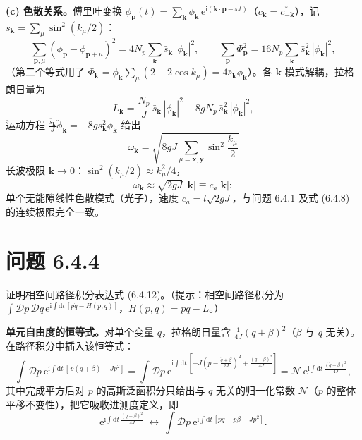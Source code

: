 \textbf{(c) 色散关系。}傅里叶变换 $\phi_{\pmb p}(t)=\sum_{\pmb k}\phi_{\pmb k}\,\mathrm{e}^{\mathrm{i}(\pmb k\cdot\pmb p-\omega t)}$（$c_{\pmb k}=c^*_{-\pmb k}$），记 $\bar s_{\pmb k}=\sum_{\mu}\sin^{2}(k_\mu/2)$：
\begin{equation*}
\sum_{\pmb p,\mu}(\phi_{\pmb p}-\phi_{\pmb p+\mu})^{2}
=4N_p\sum_{\pmb k}\bar s_{\pmb k}\,|\phi_{\pmb k}|^{2},
\qquad
\sum_{\pmb p}\Phi_{\pmb p}^{2}
=16N_p\sum_{\pmb k}\bar s_{\pmb k}^{2}\,|\phi_{\pmb k}|^{2},
\end{equation*}
（第二个等式用了 $\Phi_{\pmb k}=\phi_{\pmb k}\sum_\mu(2-2\cos k_\mu)=4\bar s_{\pmb k}\phi_{\pmb k}$）。各 $\pmb k$ 模式解耦，拉格朗日量为
\begin{equation*}
L_{\pmb k}=\frac{N_p}{J}\,\bar s_{\pmb k}\,|\dot\phi_{\pmb k}|^{2}-8gN_p\,\bar s_{\pmb k}^{2}\,|\phi_{\pmb k}|^{2},
\end{equation*}
运动方程 $\frac{\bar s_{\pmb k}}{J}\ddot\phi_{\pmb k}=-8g\bar s_{\pmb k}^{2}\phi_{\pmb k}$ 给出
\begin{equation*}
\boxed{\ \omega_{\pmb k}=\sqrt{8gJ\sum_{\mu=\pmb x,\pmb y}\sin^{2}\frac{k_\mu}{2}}\ }
\end{equation*}
长波极限 $\pmb k\to0$：$\sin^{2}(k_\mu/2)\approx k_\mu^{2}/4$，
\begin{equation*}
\omega_{\pmb k}\approx\sqrt{2gJ}\,|\pmb k|\equiv c_a|\pmb k| :
\end{equation*}
单个无能隙线性色散模式（光子），速度 $c_a=l\sqrt{2gJ}$，与问题 6.4.1 及式 (6.4.8) 的连续极限完全一致。

\section*{问题 6.4.4}
\begin{problem}
证明相空间路径积分表达式 (6.4.12)。（提示：相空间路径积分为 $\int\mathcal{D}p\,\mathcal{D}q\,\mathrm{e}^{\mathrm{i}\int\mathrm{d}t\,[p\dot q-H(p,q)]}$，$H(p,q)=p\dot q-L$。）
\end{problem}
\solution

\textbf{单元自由度的恒等式。}对单个变量 $q$，拉格朗日量含 $\frac{1}{4J}(\dot q+\beta)^{2}$（$\beta$ 与 $\dot q$ 无关）。在路径积分中插入该恒等式：
\begin{equation*}
\int\mathcal{D}p\ \mathrm{e}^{\mathrm{i}\int\mathrm{d}t\,\left[\,p(\dot q+\beta)-Jp^{2}\right]}
=\int\mathcal{D}p\ \mathrm{e}^{\mathrm{i}\int\mathrm{d}t\,\left[-J\left(p-\frac{\dot q+\beta}{2J}\right)^{2}+\frac{(\dot q+\beta)^{2}}{4J}\right]}
=\mathcal{N}\ \mathrm{e}^{\mathrm{i}\int\mathrm{d}t\,\frac{(\dot q+\beta)^{2}}{4J}} ,
\end{equation*}
其中完成平方后对 $p$ 的高斯泛函积分只给出与 $q$ 无关的归一化常数 $\mathcal{N}$（$p$ 的整体平移不变性），把它吸收进测度定义，即
\begin{equation*}
\mathrm{e}^{\mathrm{i}\int\mathrm{d}t\,\frac{(\dot q+\beta)^{2}}{4J}}
\ \leftrightarrow\
\int\mathcal{D}p\ \mathrm{e}^{\mathrm{i}\int\mathrm{d}t\,[p\dot q+p\beta-Jp^{2}]} .
\end{equation*}

